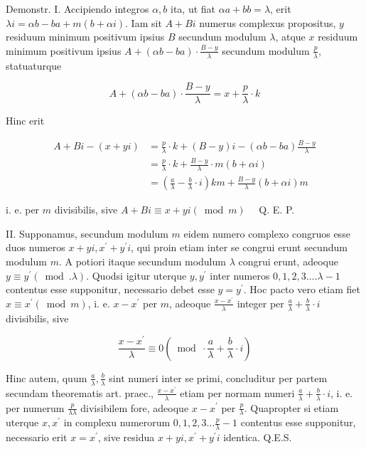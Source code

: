\documentclass[10pt]{article}
\begin{document}
Demonstr. I. Accipiendo integros \(\alpha, b\) ita, ut fiat \(\alpha a+b b=\lambda\), erit \(\lambda i=\alpha b-b a+m(b+\alpha i)\). Iam sit \(A+B i\) numerus complexus propositus, \(y\) residuum minimum positivum ipsius \(B\) secundum modulum \(\lambda\), atque \(x\) residuum minimum positivum ipsius \(A+(\alpha b-b a) \cdot \frac{B-y}{\lambda}\) secundum modulum \(\frac{p}{\lambda}\), statuaturque

\[
A+(\alpha b-b a) \cdot \frac{B-y}{\lambda}=x+\frac{p}{\lambda} \cdot k
\]

Hinc erit

\[
\begin{aligned}
A+B i-(x+y i) & =\frac{p}{\lambda} \cdot k+(B-y) i-(\alpha b-b a) \frac{B-y}{\lambda} \\
& =\frac{p}{\lambda} \cdot k+\frac{B-y}{\lambda} \cdot m(b+\alpha i) \\
& =\left(\frac{a}{\lambda}-\frac{b}{\lambda} \cdot i\right) k m+\frac{B-y}{\lambda}(b+\alpha i) m
\end{aligned}
\]

i. e. per \(m\) divisibilis, sive \(A+B i \equiv x+y i(\bmod m) \quad\) Q. E. P.

II. Supponamus, secundum modulum \(m\) eidem numero complexo congruos esse duos numeros \(x+y i, x^{\prime}+y^{\prime} i\), qui proin etiam inter se congrui erunt secundum modulum \(m\). A potiori itaque secundum modulum \(\lambda\) congrui erunt, adeoque \(y \equiv y^{\prime}(\bmod . \lambda)\). Quodsi igitur uterque \(y, y^{\prime}\) inter numeros \(0,1,2,3 \ldots . \lambda-1\) contentus esse supponitur, necessario debet esse \(y=y^{\prime}\). Hoc pacto vero etiam fiet \(x \equiv x^{\prime}(\bmod m)\), i. e. \(x-x^{\prime}\) per \(m\), adeoque \(\frac{x-x^{\prime}}{\lambda}\) integer per \(\frac{a}{\lambda}+\frac{b}{\lambda} \cdot i\) divisibilis, sive

\[
\frac{x-x^{\prime}}{\lambda} \equiv 0\left(\bmod \cdot \frac{a}{\lambda}+\frac{b}{\lambda} \cdot i\right)
\]

Hinc autem, quum \(\frac{a}{\lambda}, \frac{b}{\lambda}\) sint numeri inter se primi, concluditur per partem secundam theorematis art. praec., \(\frac{x-x^{\prime}}{\lambda}\) etiam per normam numeri \(\frac{a}{\lambda}+\frac{b}{\lambda} \cdot i\), i. e. per numerum \(\frac{p}{\lambda \lambda}\) divisibilem fore, adeoque \(x-x^{\prime}\) per \(\frac{p}{\lambda}\). Quapropter si etiam uterque \(x, x^{\prime}\) in complexu numerorum \(0,1,2,3 \ldots \frac{p}{\lambda}-1\) contentus esse supponitur, necessario erit \(x=x^{\prime}\), sive residua \(x+y i, x^{\prime}+y^{\prime} i\) identica. Q.E.S.
\end{document}
